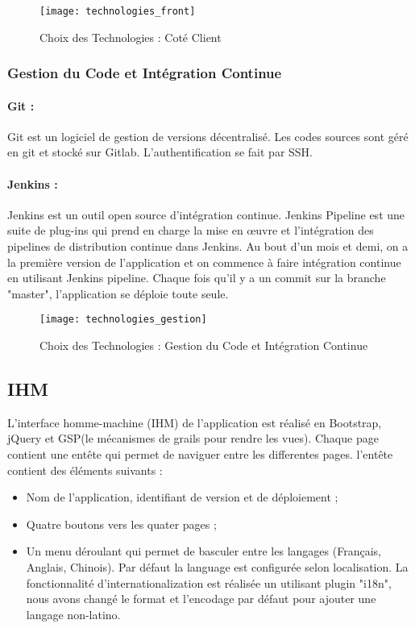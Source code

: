 \begin{figure}[ht]
 \centering
 \texttt{[image: technologies\_front]}
 \caption{Choix des Technologies : Coté Client}
 \label{fig:technologies_front}
\end{figure}

\subsubsection{Gestion du Code et Intégration Continue}

\paragraph{Git :}
Git est un logiciel de gestion de versions décentralisé.
Les codes sources sont géré en git et stocké sur Gitlab. L'authentification se fait par SSH.

\paragraph{Jenkins :}
Jenkins est un outil open source d'intégration continue.
Jenkins Pipeline est une suite de plug-ins qui prend en charge la mise en œuvre et l'intégration des pipelines de distribution continue dans Jenkins.
Au bout d'un mois et demi, on a la première version de l'application et on commence à faire intégration continue en utilisant Jenkins pipeline.
Chaque fois qu'il y a un commit sur la branche "master", l'application se déploie toute seule.

\begin{figure}[ht]
 \centering
 \texttt{[image: technologies\_gestion]}
 \caption{Choix des Technologies : Gestion du Code et Intégration Continue}
 \label{fig:technologies_gestion}
\end{figure}

\subsection{IHM}
L'interface homme-machine (IHM) de l'application est réalisé en Bootstrap, jQuery et GSP(le mécanismes de grails pour rendre les vues).
Chaque page contient une entête qui permet de naviguer entre les differentes pages.
l'entête contient des éléments suivants :
\begin{itemize}
 \item Nom de l'application, identifiant de version et de déploiement ;
 \item Quatre boutons vers les quater pages ;
 \item Un menu déroulant qui permet de basculer entre les langages (Français, Anglais, Chinois).
       Par défaut la language est configurée selon localisation.
       La fonctionnalité d'internationalization est réalisée un utilisant plugin "i18n",
       nous avons changé le format et l'encodage par défaut pour ajouter une langage non-latino.
\end{itemize}

